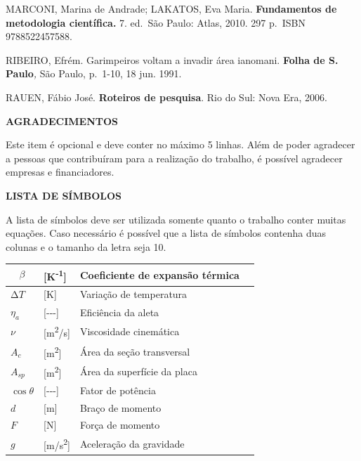 \documentclass[
]{article}
\begin{document}
MARCONI, Marina de Andrade; LAKATOS, Eva Maria. \textbf{Fundamentos de
metodologia científica. }7. ed.~São Paulo: Atlas, 2010. 297 p.~ISBN
9788522457588.

RIBEIRO, Efrém. Garimpeiros voltam a invadir área ianomani.
\textbf{Folha de S. Paulo}\emph{,} São Paulo, p.~1-10, 18 jun. 1991.

RAUEN, Fábio José. \textbf{Roteiros de pesquisa}. Rio do Sul: Nova Era,
2006.

\textbf{AGRADECIMENTOS}

Este item é opcional e deve conter no máximo 5 linhas. Além de poder
agradecer a pessoas que contribuíram para a realização do trabalho, é
possível agradecer empresas e financiadores.

\textbf{LISTA DE SÍMBOLOS}

A lista de símbolos deve ser utilizada somente quanto o trabalho conter
muitas equações. Caso necessário é possível que a lista de símbolos
contenha duas colunas e o tamanho da letra seja 10.

\begin{longtable}[]{@{}
  >{\raggedright\arraybackslash}p{}
  >{\raggedright\arraybackslash}p{}
  >{\raggedright\arraybackslash}p{}
  >{\raggedright\arraybackslash}p{}@{}}
\toprule\noalign{}
\begin{minipage}[b]{\linewidth}\raggedright
\[\beta\]
\end{minipage} & \begin{minipage}[b]{\linewidth}\raggedright
{[}K\textsuperscript{-1}{]}
\end{minipage} & \begin{minipage}[b]{\linewidth}\raggedright
Coeficiente de expansão térmica
\end{minipage} & \begin{minipage}[b]{\linewidth}\raggedright
\end{minipage} \\
\midrule\noalign{}
\endhead
\bottomrule\noalign{}
\endlastfoot
\(\mathrm{\Delta}T\) & {[}K{]} & Variação de temperatura & \\
\(\eta_{a}\) & {[}-\/-\/-{]} & Eficiência da aleta & \\
\(\nu\) & {[}m\textsuperscript{2}/s{]} & Viscosidade cinemática & \\
\(A_{c}\) & {[}m\textsuperscript{2}{]} & Área da seção transversal & \\
\(A_{sp}\) & {[}m\textsuperscript{2}{]} & Área da superfície da placa
& \\
\(\cos\theta\) & {[}-\/-\/-{]} & Fator de potência & \\
\(d\) & {[}m{]} & Braço de momento & \\
\(F\) & {[}N{]} & Força de momento & \\
\(g\) & {[}m/s\textsuperscript{2}{]} & Aceleração da gravidade & \\
\end{longtable}
\end{document}
